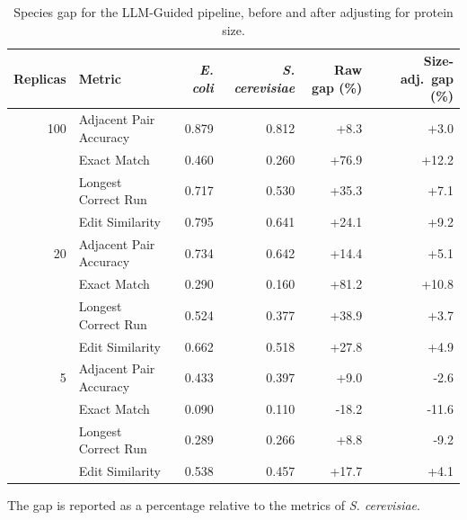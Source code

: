 \begin{table}[!tb]
  \centering
  \caption{Species gap for the LLM-Guided pipeline, before and after adjusting for protein size.}
  \label{tab:organism_gap}
  \begin{tabular}{rlrrrr}
    \toprule
    Replicas & Metric & \textit{E. coli} & \textit{S. cerevisiae} & Raw gap (\%) & Size-adj.\ gap (\%) \\
    \midrule
    100 & Adjacent Pair Accuracy & 0.879 & 0.812 & +8.3 & +3.0 \\
     & Exact Match & 0.460 & 0.260 & +76.9 & +12.2 \\
     & Longest Correct Run & 0.717 & 0.530 & +35.3 & +7.1 \\
     & Edit Similarity & 0.795 & 0.641 & +24.1 & +9.2 \\
    \midrule
    20 & Adjacent Pair Accuracy & 0.734 & 0.642 & +14.4 & +5.1 \\
     & Exact Match & 0.290 & 0.160 & +81.2 & +10.8 \\
     & Longest Correct Run & 0.524 & 0.377 & +38.9 & +3.7 \\
     & Edit Similarity & 0.662 & 0.518 & +27.8 & +4.9 \\
    \midrule
    5 & Adjacent Pair Accuracy & 0.433 & 0.397 & +9.0 & -2.6 \\
     & Exact Match & 0.090 & 0.110 & -18.2 & -11.6 \\
     & Longest Correct Run & 0.289 & 0.266 & +8.8 & -9.2 \\
     & Edit Similarity & 0.538 & 0.457 & +17.7 & +4.1 \\
    \bottomrule
  \end{tabular}
  \par\smallskip\footnotesize{The gap is reported as a percentage relative to the metrics of \textit{S. cerevisiae}.}
\end{table}
